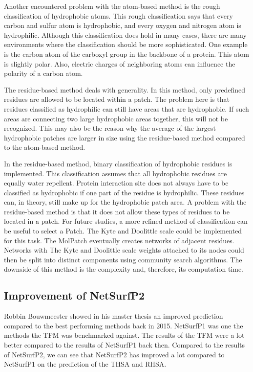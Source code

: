 \documentclass[11pt,a4paper]{article}
\begin{document}
Another encountered problem with the atom-based method is the rough classification of hydrophobic atoms. This rough classification says that every carbon and sulfur atom is hydrophobic, and every oxygen and nitrogen atom is hydrophilic. Although this classification does hold in many cases, there are many environments where the classification should be more sophisticated. One example is the carbon atom of the carboxyl group in the backbone of a protein. This atom is slightly polar. Also, electric charges of neighboring atoms can influence the polarity of a carbon atom.

The residue-based method deals with generality. In this method, only predefined residues are allowed to be located within a patch. The problem here is that residues classified as hydrophilic can still have areas that are hydrophobic. If such areas are connecting two large hydrophobic areas together, this will not be recognized. This may also be the reason why the average of the largest hydrophobic patches are larger in size using the residue-based method compared to the atom-based method.
    
In the residue-based method, binary classification of hydrophobic residues is implemented. This classification assumes that all hydrophobic residues are equally water repellent. Protein interaction site does not always have to be classified as hydrophobic if one part of the residue is hydrophilic. These residues can, in theory, still make up for the hydrophobic patch area. A problem with the residue-based method is that it does not allow these types of residues to be located in a patch. For future studies, a more refined method of classification can be useful to select a Patch. The Kyte and Doolittle scale could be implemented for this task. The MolPatch eventually creates networks of adjacent residues. Networks with The Kyte and Doolittle scale weights attached to its nodes could then be split into distinct components using community search algorithms.  The downside of this method is the complexity and, therefore, its computation time.

\subsection{Improvement of NetSurfP2}
Robbin Bouwmeester showed in his master thesis an improved prediction compared to the best performing methods back in 2015. NetSurfP1 was one the methods the TFM was benchmarked against. The results of the TFM were a lot better compared to the results of NetSurfP1 back then. Compared to the results of NetSurfP2, we can see that NetSurfP2 has improved a lot compared to NetSurfP1 on the prediction of the THSA and RHSA.  
\end{document}
